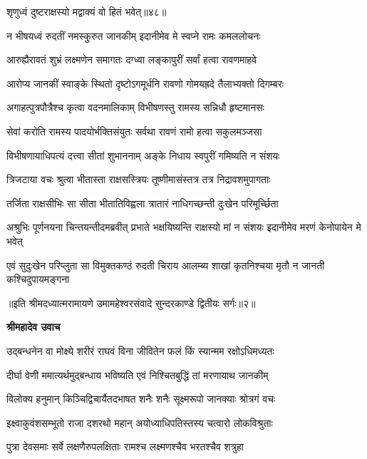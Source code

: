 {शृणुध्वं दुष्टराक्षस्यो मद्वाक्यं वो हितं भवेत्॥४८॥} %


\twolineshloka
{न भीषयध्वं रुदतीं नमस्कुरुत जानकीम्}
{इदानीमेव मे स्वप्ने रामः कमललोचनः} %

\twolineshloka
{आरुह्यैरावतं शुभ्रं लक्ष्मणेन समागतः}
{दग्ध्वा लङ्कापुरीं सर्वां हत्वा रावणमाहवे} %

\twolineshloka
{आरोप्य जानकीं स्वाङ्के स्थितो दृष्टोऽगमूर्धनि}
{रावणो गोमयह्रदे तैलाभ्यक्तो दिगम्बरः} %

\twolineshloka
{अगाहत्पुत्रपौत्रैश्च कृत्वा वदनमालिकाम्}
{विभीषणस्तु रामस्य सन्निधौ हृष्टमानसः} %

\twolineshloka
{सेवां करोति रामस्य पादयोर्भक्तिसंयुतः}
{सर्वथा रावणं रामो हत्वा सकुलमञ्जसा} %

\twolineshloka
{विभीषणायाधिपत्यं दत्त्वा सीतां शुभाननाम्}
{अङ्के निधाय स्वपुरीं गमिष्यति न संशयः} %

\twolineshloka
{त्रिजटाया वचः श्रुत्वा भीतास्ता राक्षसस्त्रियः}
{तूष्णीमासंस्तत्र तत्र निद्रावशमुपागताः} %

\twolineshloka
{तर्जिता राक्षसीभिः सा सीता भीतातिविह्वला}
{त्रातारं नाधिगच्छन्ती दुःखेन परिमूर्च्छिता} %

\threelineshloka
{अश्रुभिः पूर्णनयना चिन्तयन्तीदमब्रवीत्}
{प्रभाते भक्षयिष्यन्ति राक्षस्यो मां न संशयः}
{इदानीमेव मरणं केनोपायेन मे भवेत्} %

\fourlineindentedshloka
{एवं सुदुःखेन परिप्लुता सा}
{विमुक्तकण्ठं रुदती चिराय}
{आलम्ब्य शाखां कृतनिश्चया मृतौ}
{न जानती कश्चिदुपायमङ्गना} %

{॥इति श्रीमदध्यात्मरामायणे उमामहेश्वरसंवादे सुन्दरकाण्डे
द्वितीयः सर्गः॥२॥
}




\textbf{श्रीमहादेव उवाच}

\twolineshloka
{उद्बन्धनेन वा मोक्ष्ये शरीरं राघवं विना}
{जीवितेन फलं किं स्यान्मम रक्षोऽधिमध्यतः} %

\twolineshloka
{दीर्घा वेणी ममात्यर्थमुद्बन्धाय भविष्यति}
{एवं निश्चितबुद्धिं तां मरणायाथ जानकीम्} %

\twolineshloka
{विलोक्य हनुमान् किञ्चिद्विचार्यैतदभाषत}
{शनैः शनैः सूक्ष्मरूपो जानक्याः श्रोत्रगं वचः} %

\twolineshloka
{इक्ष्वाकुवंशसम्भूतो राजा दशरथो महान्}
{अयोध्याधिपतिस्तस्य चत्वारो लोकविश्रुताः} %

\twolineshloka
{पुत्रा देवसमाः सर्वे लक्षणैरुपलक्षिताः}
{रामश्च लक्ष्मणश्चैव भरतश्चैव शत्रुहा} %


